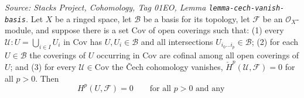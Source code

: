 \begin{lemma}\leanok
  \label{lem:cech_to_cohomology_on_basis}
  \textit{Source: Stacks Project, Cohomology, Tag 01EO, Lemma
  \texttt{lemma-cech-vanish-basis}.}
  Let \(X\) be a ringed space, let \(\mathcal{B}\) be a basis for its topology, let
  \(\mathcal{F}\) be an \(\mathcal{O}_X\)-module, and suppose there is a set
  \(\mathrm{Cov}\) of open coverings such that: (1) every \(\mathcal{U} :
  U = \bigcup_{i \in I} U_i\) in \(\mathrm{Cov}\) has \(U, U_i \in \mathcal{B}\) and
  all intersections \(U_{i_0 \ldots i_p} \in \mathcal{B}\); (2) for each
  \(U \in \mathcal{B}\) the coverings of \(U\) occurring in \(\mathrm{Cov}\) are
  cofinal among all open coverings of \(U\); and (3) for every \(\mathcal{U} \in
  \mathrm{Cov}\) the {\v C}ech cohomology vanishes,
  \(\check{H}^p(\mathcal{U}, \mathcal{F}) = 0\) for all \(p > 0\). Then
  \[
    H^p(U, \mathcal{F}) = 0 \qquad \text{for all } p > 0 \text{ and any }
\]
\end{lemma}
